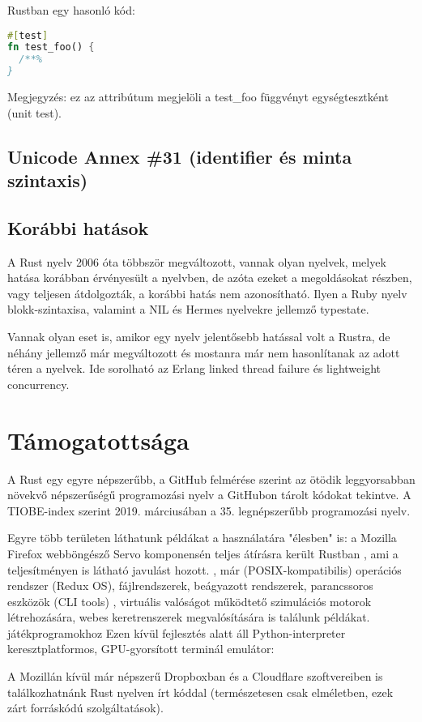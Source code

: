 Rustban egy hasonló kód:
\begin{lstlisting}[language=Rust, style=boxed]
#[test]
fn test_foo() {
  /**%
}
\end{lstlisting}
Megjegyzés: ez az attribútum megjelöli a test\_foo függvényt egységtesztként (unit test).

\subsection{Unicode Annex \#31 (identifier és minta szintaxis)}

\subsection{Korábbi hatások}
A Rust nyelv 2006 óta többször megváltozott, vannak olyan nyelvek, melyek hatása korábban érvényesült a nyelvben, de azóta ezeket a megoldásokat részben, vagy teljesen átdolgozták, a korábbi hatás nem azonosítható. Ilyen a Ruby nyelv blokk-szintaxisa, valamint a NIL és Hermes nyelvekre jellemző typestate.

Vannak olyan eset is, amikor egy nyelv jelentősebb hatással volt a Rustra, de néhány jellemző már megváltozott és mostanra már nem hasonlítanak az adott téren a nyelvek. Ide sorolható az Erlang linked thread failure és lightweight concurrency.

\section{Támogatottsága}
A Rust egy egyre népszerűbb, a GitHub felmérése szerint %
az ötödik leggyorsabban növekvő népszerűségű programozási nyelv a GitHubon tárolt kódokat tekintve. A TIOBE-index szerint %
2019. márciusában a 35. legnépszerűbb programozási nyelv.

Egyre több területen láthatunk példákat a használatára "élesben" is: a Mozilla Firefox webböngésző Servo komponensén teljes átírásra került Rustban
, ami a teljesítményen is látható javulást hozott. %
, már (POSIX-kompatibilis) operációs rendszer (Redux OS), fájlrendszerek, beágyazott rendszerek, parancssoros eszközök (CLI tools) %
, virtuális valóságot működtető szimulációs motorok létrehozására, webes keretrenszerek megvalósítására is találunk példákat. %
játékprogramokhoz %
Ezen kívül fejlesztés alatt áll Python-interpreter %
keresztplatformos, GPU-gyorsított terminál emulátor: %

A Mozillán kívül már népszerű Dropboxban és a Cloudflare szoftvereiben is találkozhatnánk Rust nyelven írt kóddal (természetesen csak elméletben, ezek zárt forráskódú szolgáltatások).
